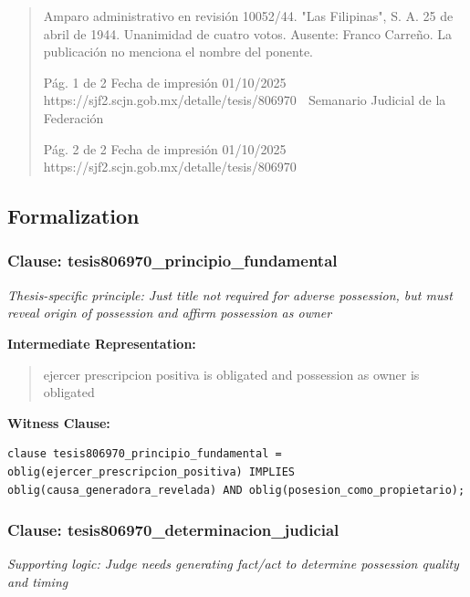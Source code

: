 \documentclass[11pt,a4paper]{article}
\begin{document}
\begin{quote}
Amparo administrativo en revisión 10052/44. "Las Filipinas", S. A. 25 de abril de 1944. Unanimidad
de cuatro votos. Ausente: Franco Carreño. La publicación no menciona el nombre del ponente.




                                              Pág. 1 de 2             Fecha de impresión 01/10/2025
  https://sjf2.scjn.gob.mx/detalle/tesis/806970
                                                Semanario Judicial de la Federación




                                           Pág. 2 de 2       Fecha de impresión 01/10/2025
https://sjf2.scjn.gob.mx/detalle/tesis/806970

\end{quote}

\subsection{Formalization}

\subsubsection{Clause: tesis806970\_principio\_fundamental}

\textit{Thesis-specific principle: Just title not required for adverse possession, but must reveal origin of possession and affirm possession as owner}

\textbf{Intermediate Representation:}

\begin{quote}
ejercer prescripcion positiva is obligated and possession as owner is obligated
\end{quote}

\textbf{Witness Clause:}

\begin{lstlisting}[style=witnessstyle, language=Witness]
clause tesis806970_principio_fundamental = oblig(ejercer_prescripcion_positiva) IMPLIES oblig(causa_generadora_revelada) AND oblig(posesion_como_propietario);
\end{lstlisting}

\subsubsection{Clause: tesis806970\_determinacion\_judicial}

\textit{Supporting logic: Judge needs generating fact/act to determine possession quality and timing}
\end{document}
